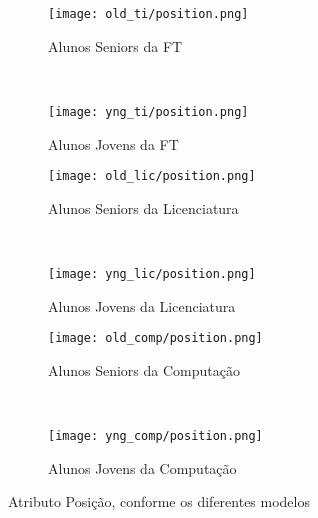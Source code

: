\clearpage
\begin{figure}[!ht]
    \centering
    \begin{subfigure}[b]{0.48\textwidth}
        \centering
        \texttt{[image: old\_ti/position.png]}
        \caption{Alunos Seniors da FT}
    \end{subfigure}
    ~
    \begin{subfigure}[b]{0.48\textwidth}
        \centering
        \texttt{[image: yng\_ti/position.png]}
        \caption{Alunos Jovens da FT}
    \end{subfigure}

    \begin{subfigure}[b]{0.48\textwidth}
        \centering
        \texttt{[image: old\_lic/position.png]}
        \caption{Alunos Seniors da Licenciatura}
    \end{subfigure}
    ~
    \begin{subfigure}[b]{0.48\textwidth}
        \centering
        \texttt{[image: yng\_lic/position.png]}
        \caption{Alunos Jovens da Licenciatura}
    \end{subfigure}

    \begin{subfigure}[b]{0.48\textwidth}
        \centering
        \texttt{[image: old\_comp/position.png]}
        \caption{Alunos Seniors da Computação}
    \end{subfigure}
    ~
    \begin{subfigure}[b]{0.48\textwidth}
        \centering
        \texttt{[image: yng\_comp/position.png]}
        \caption{Alunos Jovens da Computação}
    \end{subfigure}
    \caption{Atributo Posição, conforme os diferentes modelos}
\end{figure}


